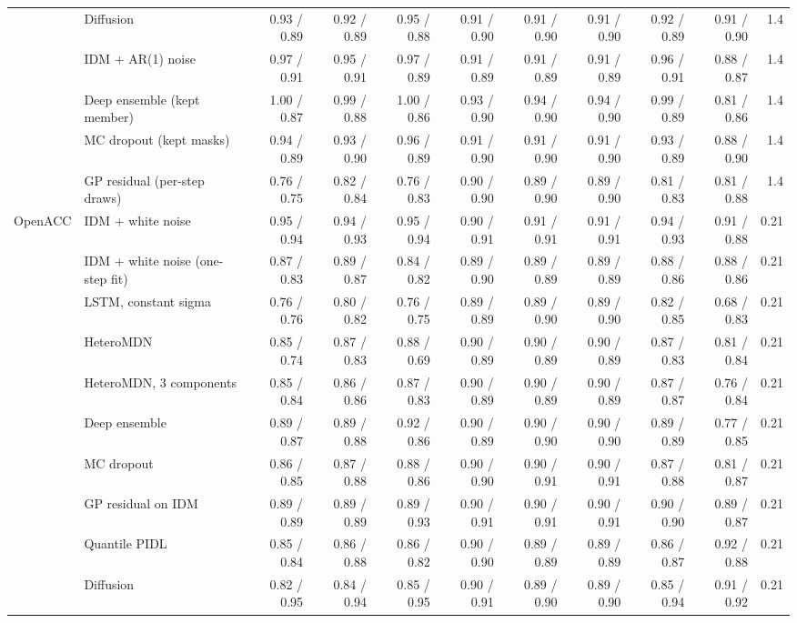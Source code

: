 \begin{longtable}{llrrrrrrrrr}
 & Diffusion & 0.93 / 0.89 & 0.92 / 0.89 & 0.95 / 0.88 & 0.91 / 0.90 & 0.91 / 0.90 & 0.91 / 0.90 & 0.92 / 0.89 & 0.91 / 0.90 & 1.4 \\
 & IDM + AR(1) noise & 0.97 / 0.91 & 0.95 / 0.91 & 0.97 / 0.89 & 0.91 / 0.89 & 0.91 / 0.89 & 0.91 / 0.89 & 0.96 / 0.91 & 0.88 / 0.87 & 1.4 \\
 & Deep ensemble (kept member) & 1.00 / 0.87 & 0.99 / 0.88 & 1.00 / 0.86 & 0.93 / 0.90 & 0.94 / 0.90 & 0.94 / 0.90 & 0.99 / 0.89 & 0.81 / 0.86 & 1.4 \\
 & MC dropout (kept masks) & 0.94 / 0.89 & 0.93 / 0.90 & 0.96 / 0.89 & 0.91 / 0.90 & 0.91 / 0.90 & 0.91 / 0.90 & 0.93 / 0.89 & 0.88 / 0.90 & 1.4 \\
 & GP residual (per-step draws) & 0.76 / 0.75 & 0.82 / 0.84 & 0.76 / 0.83 & 0.90 / 0.90 & 0.89 / 0.90 & 0.89 / 0.90 & 0.81 / 0.83 & 0.81 / 0.88 & 1.4 \\
\midrule
OpenACC & IDM + white noise & 0.95 / 0.94 & 0.94 / 0.93 & 0.95 / 0.94 & 0.90 / 0.91 & 0.91 / 0.91 & 0.91 / 0.91 & 0.94 / 0.93 & 0.91 / 0.88 & 0.21 \\
 & IDM + white noise (one-step fit) & 0.87 / 0.83 & 0.89 / 0.87 & 0.84 / 0.82 & 0.89 / 0.90 & 0.89 / 0.89 & 0.89 / 0.89 & 0.88 / 0.86 & 0.88 / 0.86 & 0.21 \\
 & LSTM, constant sigma & 0.76 / 0.76 & 0.80 / 0.82 & 0.76 / 0.75 & 0.89 / 0.89 & 0.89 / 0.90 & 0.89 / 0.90 & 0.82 / 0.85 & 0.68 / 0.83 & 0.21 \\
 & HeteroMDN & 0.85 / 0.74 & 0.87 / 0.83 & 0.88 / 0.69 & 0.90 / 0.89 & 0.90 / 0.89 & 0.90 / 0.89 & 0.87 / 0.83 & 0.81 / 0.84 & 0.21 \\
 & HeteroMDN, 3 components & 0.85 / 0.84 & 0.86 / 0.86 & 0.87 / 0.83 & 0.90 / 0.89 & 0.90 / 0.89 & 0.90 / 0.89 & 0.87 / 0.87 & 0.76 / 0.84 & 0.21 \\
 & Deep ensemble & 0.89 / 0.87 & 0.89 / 0.88 & 0.92 / 0.86 & 0.90 / 0.89 & 0.90 / 0.90 & 0.90 / 0.90 & 0.89 / 0.89 & 0.77 / 0.85 & 0.21 \\
 & MC dropout & 0.86 / 0.85 & 0.87 / 0.88 & 0.88 / 0.86 & 0.90 / 0.90 & 0.90 / 0.91 & 0.90 / 0.91 & 0.87 / 0.88 & 0.81 / 0.87 & 0.21 \\
 & GP residual on IDM & 0.89 / 0.89 & 0.89 / 0.89 & 0.89 / 0.93 & 0.90 / 0.91 & 0.90 / 0.91 & 0.90 / 0.91 & 0.90 / 0.90 & 0.89 / 0.87 & 0.21 \\
 & Quantile PIDL & 0.85 / 0.84 & 0.86 / 0.88 & 0.86 / 0.82 & 0.90 / 0.90 & 0.89 / 0.89 & 0.89 / 0.89 & 0.86 / 0.87 & 0.92 / 0.88 & 0.21 \\
 & Diffusion & 0.82 / 0.95 & 0.84 / 0.94 & 0.85 / 0.95 & 0.90 / 0.91 & 0.89 / 0.90 & 0.89 / 0.90 & 0.85 / 0.94 & 0.91 / 0.92 & 0.21 \\

\end{longtable}
